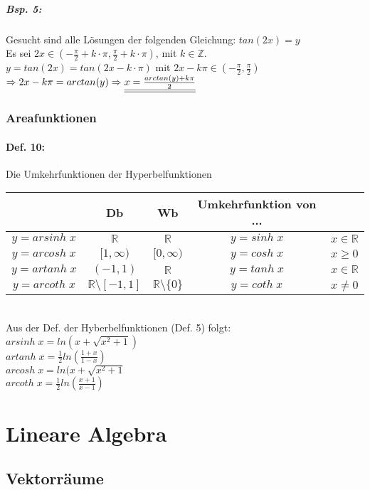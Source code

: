 \subparagraph{Bsp. 5:}\parskp
Gesucht sind alle Lösungen der folgenden Gleichung: $tan(2x)=y$\\
Es sei $2x \in \left( -\frac{\pi}{2}+k \cdot \pi, \frac{\pi}{2} + k \cdot \pi\right)$, mit $k \in \mathbb{Z}$.\\
$y=tan(2x)=tan(2x-k\cdot \pi)$ mit $2x-k\pi \in \left(-\frac{\pi}{2}, \frac{\pi}{2}\right)$\\
$\Rightarrow 2x - k \pi = arctan(y) \Rightarrow \underline{\underline{x = \frac{arctan(y)+k\pi}{2}}}$

\subsubsection{Areafunktionen}

\paragraph{Def. 10:} \parskp
Die Umkehrfunktionen der Hyperbelfunktionen\\
\begin{tabular}{c | c | c | c l}
 & Db & Wb & Umkehrfunktion von ...\\
\hline
$y=arsinh\; x$ & $\mathbb{R}$ & $\mathbb{R}$ & $y=sinh\;x$ & $ x \in \mathbb{R}$\\
$y=arcosh\; x $ & $[1,\infty)$ & $[0,\infty)$ & $y=cosh\; x$ & $x\geq 0$\\
$y=artanh\; x$ & $(-1,1)$ & $\mathbb{R}$ & $y=tanh \; x $ & $x \in \mathbb{R}$\\
$y=arcoth\; x $ & $\mathbb{R}\setminus[-1,1]$ & $\mathbb{R}\setminus\{0\}$ & $y=coth\; x$ & $x \not = 0$\\
\end{tabular}\\
Aus der Def. der Hyberbelfunktionen (Def. 5) folgt:\\
$arsinh\; x = ln (x+\sqrt{x^2+1})$\\
$artanh\; x=\frac{1}{2}ln\left(\frac{1+x}{1-x}\right)$\\
$arcosh\; x = ln (x+\sqrt{x^2+1}$\\
$arcoth\; x = \frac{1}{2}ln\left(\frac{x+1}{x-1}\right)$

\section{Lineare Algebra}

\subsection{Vektorräume}

